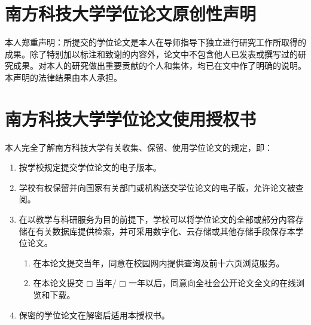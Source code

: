 \begin{statementcopyright}
  \section*{南方科技大学学位论文原创性声明}
  \vspace{1em}

    本人郑重声明：所提交的学位论文是本人在导师指导下独立进行研究工作所取得的成果。除了特别加以标注和致谢的内容外，论文中不包含他人已发表或撰写过的研究成果。对本人的研究做出重要贡献的个人和集体，均已在文中作了明确的说明。本声明的法律结果由本人承担。

  \authorsign

  \vspace{1em}
  \section*{南方科技大学学位论文使用授权书}
  \vspace{1em}

    本人完全了解南方科技大学有关收集、保留、使用学位论文的规定，即：

    \begin{enumerate}[wide]
      \item 按学校规定提交学位论文的电子版本。
      \item 学校有权保留并向国家有关部门或机构送交学位论文的电子版，允许论文被查阅。
      \item 在以教学与科研服务为目的前提下，学校可以将学位论文的全部或部分内容存储在有关数据库提供检索，并可采用数字化、云存储或其他存储手段保存本学位论文。
        \begin{enumerate}[wide,label={(\arabic*)}]
          \item 在本论文提交当年，同意在校园网内提供查询及前十六页浏览服务。
          \item 在本论文提交 $\mdlgwhtsquare$ 当年/ $\mdlgwhtsquare$ 一年以后，同意向全社会公开论文全文的在线浏览和下载。
        \end{enumerate}
      \item 保密的学位论文在解密后适用本授权书。
    \end{enumerate}

  \authorsupervisorsign

\end{statementcopyright}